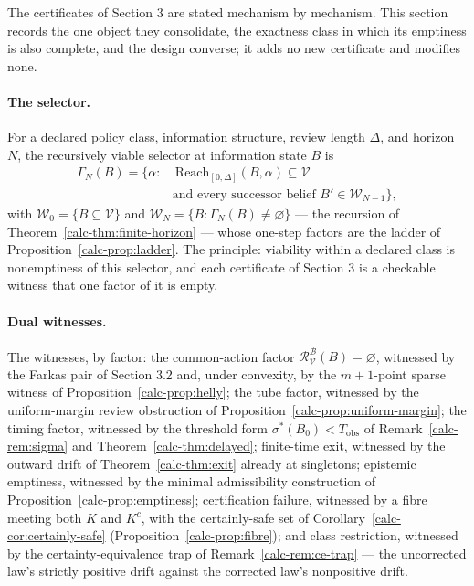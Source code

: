 \documentclass[10pt,twocolumn]{article}
\theoremstyle{definition}
\begin{document}
The certificates of Section 3 are stated mechanism by mechanism. This section records the one object they consolidate, the exactness class in which its emptiness is also complete, and the design converse; it adds no new certificate and modifies none.

\paragraph{The selector.} For a declared policy class, information structure, review length \(\Delta\), and horizon \(N\), the recursively viable selector at information state \(B\) is
\[
\begin{split}
\Gamma_{N}(B) = \bigl\{\alpha :&\ \mathrm{Reach}_{[0,\Delta]}(B,\alpha) \subseteq \mathcal{V} \\
&\text{and every successor belief } B' \in \mathcal{W}_{N-1}\bigr\},
\end{split}
\]
with \(\mathcal{W}_{0} = \{B \subseteq \mathcal{V}\}\) and \(\mathcal{W}_{N} = \{B : \Gamma_{N}(B) \neq \varnothing\}\) --- the recursion of Theorem~\ref{calc-thm:finite-horizon} --- whose one-step factors are the ladder of Proposition~\ref{calc-prop:ladder}. The principle: viability within a declared class is nonemptiness of this selector, and each certificate of Section 3 is a checkable witness that one factor of it is empty.

\paragraph{Dual witnesses.} The witnesses, by factor: the common-action factor \(\mathcal{R}^{\mathcal{B}}_{\mathcal{V}}(B) = \varnothing\), witnessed by the Farkas pair of Section 3.2 and, under convexity, by the \(m+1\)-point sparse witness of Proposition~\ref{calc-prop:helly}; the tube factor, witnessed by the uniform-margin review obstruction of Proposition~\ref{calc-prop:uniform-margin}; the timing factor, witnessed by the threshold form \(\sigma^{*}(B_{0}) < T_{\mathrm{obs}}\) of Remark~\ref{calc-rem:sigma} and Theorem~\ref{calc-thm:delayed}; finite-time exit, witnessed by the outward drift of Theorem~\ref{calc-thm:exit} already at singletons; epistemic emptiness, witnessed by the minimal admissibility construction of Proposition~\ref{calc-prop:emptiness}; certification failure, witnessed by a fibre meeting both \(K\) and \(K^{c}\), with the certainly-safe set of Corollary~\ref{calc-cor:certainly-safe} (Proposition~\ref{calc-prop:fibre}); and class restriction, witnessed by the certainty-equivalence trap of Remark~\ref{calc-rem:ce-trap} --- the uncorrected law's strictly positive drift against the corrected law's nonpositive drift.
\end{document}
